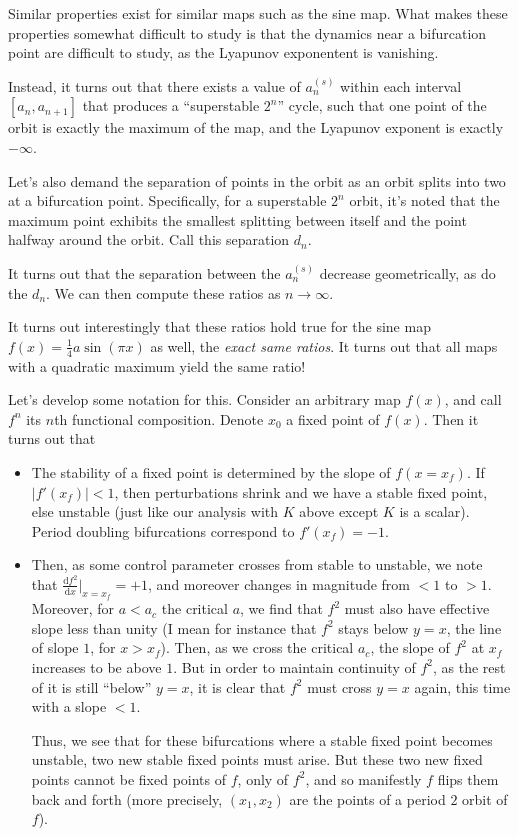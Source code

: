 \documentclass[12pt]{article}
\newcommand{\rd}[2]{\frac{\mathrm{d}#1}{\mathrm{d}#2}}
\newcommand{\abs}[1]{\left|#1\right|}
\begin{document}
Similar properties exist for similar maps such as the sine map. What makes these
properties somewhat difficult to study is that the dynamics near a bifurcation
point are difficult to study, as the Lyapunov exponentent is vanishing.

Instead, it turns out that there exists a value of $a_n^{(s)}$ within each
interval $[a_n, a_{n+1}]$ that produces a ``superstable $2^n$'' cycle, such
that one point of the orbit is exactly the maximum of the map, and the Lyapunov
exponent is exactly $-\infty$.

Let's also demand the separation of points in the orbit as an orbit splits into
two at a bifurcation point. Specifically, for a superstable $2^n$ orbit, it's
noted that the maximum point exhibits the smallest splitting between itself and
the point halfway around the orbit. Call this separation $d_n$.

It turns out that the separation between the $a_n^{(s)}$ decrease geometrically,
as do the $d_n$. We can then compute these ratios as $n \to \infty$.

It turns out interestingly that these ratios hold true for the sine map
$f(x) = \frac{1}{4}a \sin\left( \pi x \right)$ as well, the \emph{exact same
ratios}. It turns out that all maps with a quadratic maximum yield the same
ratio!

Let's develop some notation for this. Consider an arbitrary map $f(x)$, and call
$f^n$ its $n$th functional composition. Denote $x_0$ a fixed point of $f(x)$.
Then it turns out that
\begin{itemize}
    \item The stability of a fixed point is determined by the slope of
        $f(x=x_f)$. If $\abs{f'(x_f)} < 1$, then perturbations shrink and we
        have a stable fixed point, else unstable (just like our analysis with
        $K$ above except $K$ is a scalar). Period doubling bifurcations
        correspond to $f'(x_f) = -1$.
    \item Then, as some control parameter crosses from stable to unstable, we
        note that $\rd{f^2}{x}\Bigg|_{x=x_f} = +1$, and moreover changes in
        magnitude from $<1$ to $>1$. Moreover, for $a < a_c$ the critical $a$,
        we find that $f^2$ must also have effective slope less than unity
        (I mean for instance that $f^2$ stays below $y=x$, the line of slope
        $1$, for $x > x_f$). Then, as we cross the critical $a_c$, the slope of
        $f^2$ at $x_f$ increases to be above $1$. But in order to maintain
        continuity of $f^2$, as the rest of it is still ``below'' $y=x$, it is
        clear that $f^2$ must cross $y=x$ again, this time with a slope $<1$.


        Thus, we see that for these bifurcations where a stable fixed point
        becomes unstable, two new stable fixed points must arise. But these two
        new fixed points cannot be fixed points of $f$, only of $f^2$, and so
        manifestly $f$ flips them back and forth (more precisely, $(x_1, x_2)$
        are the points of a period $2$ orbit of $f$).
\end{itemize}
\end{document}
